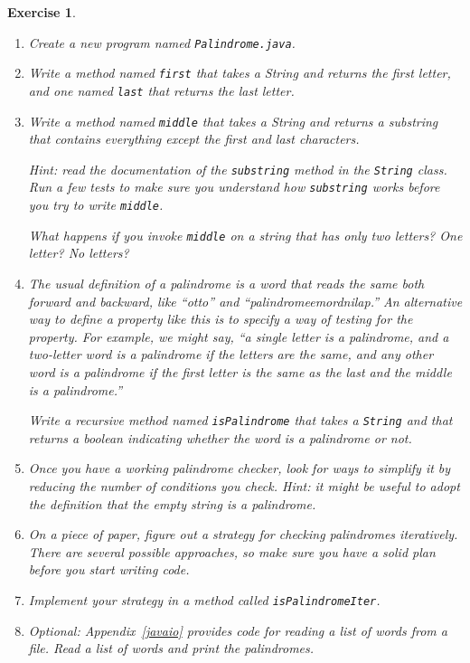 \documentclass[12pt]{book}
\theoremstyle{exercise}
\newtheorem{exercise}{Exercise}[chapter]
\begin{document}
\begin{exercise}
\label{palindrome}

\begin{enumerate}

\item Create a new program named {\tt Palindrome.java}.

\item Write a method named {\tt first}
that takes a String and returns the first letter, and one named
{\tt last} that returns the last letter.

\item Write a method named {\tt middle} that takes a String and
returns a substring that contains everything {\em except} the
first and last characters.

Hint: read the documentation of the {\tt substring} method in
the {\tt String} class.
Run a few tests to make sure you understand how {\tt substring} works
before you try to write {\tt middle}.

What happens if you invoke {\tt middle} on a string that has only
two letters?  One letter?  No letters?

\item The usual definition of a palindrome is a word that reads the
same both forward and backward, like ``otto'' and
``palindromeemordnilap.''  An alternative way to define a property
like this is to specify a way of testing for the property.  For
example, we might say, ``a single letter is a palindrome, and a
two-letter word is a palindrome if the letters are the same, and
any other word is a palindrome if
the first letter is the same as the
last and the middle is a palindrome.''

Write a recursive method named {\tt isPalindrome} that takes
a {\tt String} and that returns a boolean indicating whether the
word is a palindrome or not.

\item Once you have a working palindrome checker, look for ways
to simplify it by reducing the number of conditions you check.
Hint: it might be useful to adopt the definition that the empty
string is a palindrome.

\item On a piece of paper, figure out a strategy for checking
palindromes iteratively.  There are several possible approaches,
so make sure you have a solid plan before you start writing code.

\item Implement your strategy in a method called {\tt isPalindromeIter}.

\item Optional: Appendix~\ref{javaio} provides code for reading a list
of words from a file.  Read a list of words and print the palindromes.

\end{enumerate}
\end{exercise}
\end{document}
